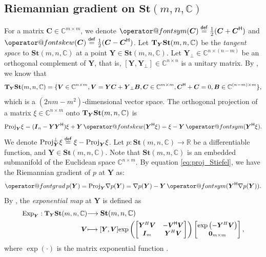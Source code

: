 \documentclass[final,onefignum,onetabnum]{siamart190516}
\makeatletter
\newcommand{\matr}[1]{\boldsymbol{#1}}
\renewcommand{\H}{{\sf H}} %
\newcommand{\symmm}[1]{\mathop{\operator@font sym}(#1)}
\newcommand{\skeww}[1]{\mathop{\operator@font skew}(#1)}
\newcommand{\ProjGrad}[2]{\mathop{{\operator@font grad} }#1(#2)}
\newcommand{\eqdef}{\stackrel{\sf def}{=}}
\newcommand{\RR}{\mathbb{R}}
\newcommand{\CC}{\mathbb{C}}
\renewcommand{\H}{{\sf H}}      %
\newcommand{\expp}[1]{\mathrm{exp}\left(#1\right)}
\newcommand{\St}{\mathbf{St}}
\makeatother
\begin{document}
\subsection{Riemannian gradient on $\St(m,n,\CC)$}

For a matrix  $\matr{C}\in\CC^{m\times m}$, we denote 
$\symmm{\matr{C}}\eqdef\frac{1}{2}(\matr{C}+\matr{C}^{\H})$ 
and 
$\skeww{\matr{C}}\eqdef\frac{1}{2}(\matr{C}-\matr{C}^{\H})$. 
Let ${\rm\bf T}_{\matr{Y}} \St(m,n,\CC)$ be the \emph{tangent space} to $\St(m,n,\CC)$ at a point $\matr{Y}\in\St(m,n,\CC)$.  
Let $\matr{Y}_{\perp}\in\CC^{n\times (n-m)}$ be an orthogonal complement of $\matr{Y}$, that is, $[\matr{Y},  \matr{Y}_{\perp}]\in\CC^{n\times n}$ is a unitary matrix.  
By \cite[Definition 6]{manton2001modified}, we know that 
\begin{align*}{\small
{\rm\bf T}_{\matr{Y}} \St(m,n,\CC) 
= \{\matr{V}\in\CC^{n\times m}, \matr{V}=\matr{Y}\matr{C}+\matr{Y}_{\perp}\matr{B},
\matr{C}\in\CC^{m\times m}, \matr{C}^{\H}+\matr{C}=0, \matr{B}\in\CC^{(n-m)\times m}\},\label{eq:tanget_spac}}
\end{align*} 
which is a $(2nm-m^2)$-dimensional vector space. 
The orthogonal projection of a matrix  $\xi\in\CC^{n\times m}$ onto ${\rm\bf T}_{\matr{Y}} \St(m,n,\CC)$ is 
\begin{equation}\label{eq:proj_Stiefel}
{\rm Proj}_{\matr{Y}} \xi = (\matr{I}_{n}-\matr{Y}\matr{Y}^{\H})\xi + \matr{Y}\skeww{\matr{Y}^{\H}\xi} 
=\xi - \matr{Y}\symmm{\matr{Y}^{\H}\xi}.
\end{equation} 
We denote ${\rm Proj}^{\bot}_{\matr{Y}} \xi \eqdef\xi - {\rm Proj}_{\matr{Y}} \xi $. 
Let $p:\St(m,n,\CC)\rightarrow\RR$ be a differentiable function, and $\matr{Y}\in\St(m,n,\CC)$. 
Note that $\St(m,n,\CC)$ is an embedded submanifold of the Euclidean space $\CC^{n\times m}$. 
By equation \cref{eq:proj_Stiefel}, we have the Riemannian gradient of $p$ at $\matr{Y}$ as:
\begin{align}\label{eq:Rie_grad}
\ProjGrad{p}{\matr{Y}} = {\rm Proj}_{\matr{Y}} \nabla p(\matr{Y})
= \nabla p(\matr{Y}) -\matr{Y}\symmm{\matr{Y}^{\H}\nabla p(\matr{Y})}.
\end{align}
By \cite[Example 5.4.2]{absil2009optimization},
the \emph{exponential map} at $\matr{Y}$ is defined as
\begin{align}\label{eq:ex_sl_pr}{\small
{\rm Exp}_{\matr{Y}}: {\rm\bf T}_{\matr{Y}} \St(m,n,\CC)}&{\small\longrightarrow \St(m,n,\CC)}\\
{\small\matr{V}}&{\small\longmapsto [\matr{Y}, \matr{V}]
\expp{
\begin{bmatrix}
\matr{Y}^{H}\matr{V} &-\matr{V}^{\H}\matr{V}\\
\matr{I}_{m} &\matr{Y}^{H}\matr{V}
\end{bmatrix}}
\begin{bmatrix}
\expp{-\matr{Y}^{H}\matr{V}} \\
\matr{0}_{m\times m}
\end{bmatrix},\notag}
\end{align}
where 
$\exp(\cdot)$ is the matrix exponential function \cite{absil2009optimization,baker2012matrix,Hall15:lie}. 
\end{document}

